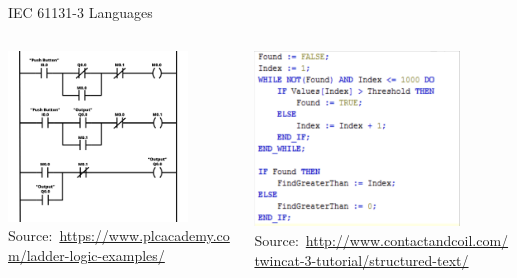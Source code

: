 \documentclass[18pt]{beamer}
\begin{document}
\begin{frame}{IEC 61131-3 Languages}
    \begin{columns}
    	\begin{column}{0.5\textwidth}
    		\includegraphics[width=0.8\textwidth]{figures/ld.png}
           {\footnotesize  Source:~\url{https://www.plcacademy.com/ladder-logic-examples/}}
    	\end{column}
        \begin{column}{0.5\textwidth}
            \includegraphics[width=0.8\textwidth]{./figures/st.png}
            {\footnotesize Source:~\url{http://www.contactandcoil.com/twincat-3-tutorial/structured-text/}}
        \end{column}
    \end{columns}
\end{frame}
\end{document}
